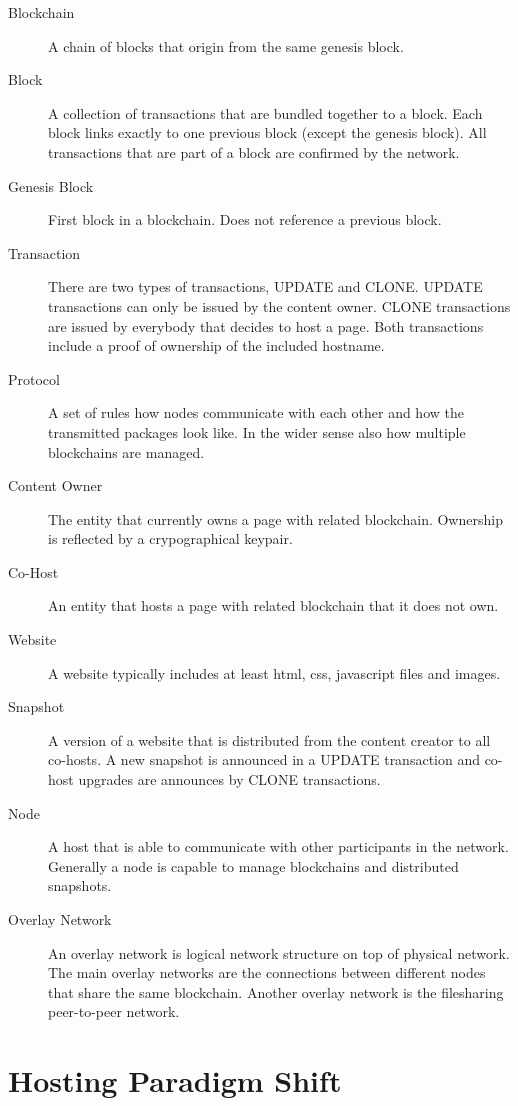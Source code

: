 \begin{description}
\item[Blockchain] A chain of blocks that origin from the same genesis block.
\item[Block] A collection of transactions that are bundled together to a
block. Each block links exactly to one previous block (except the genesis
block). All transactions that are part of a block are confirmed by the network.
\item[Genesis Block] First block in a blockchain. Does not reference a
previous block.
\item[Transaction] There are two types of transactions, UPDATE and CLONE.
UPDATE transactions can only be issued by the content owner. CLONE
transactions are issued by everybody that decides to host a page. Both
transactions include a proof of ownership of the included hostname.
\item[Protocol] A set of rules how nodes communicate with each other and how
the transmitted packages look like. In the wider sense also how multiple
blockchains are managed.
\item[Content Owner] The entity that currently owns a page with related
blockchain. Ownership is reflected by a crypographical keypair.
\item[Co-Host] An entity that hosts a page with related blockchain that it
does not own.
\item[Website] A website typically includes at least html, css, javascript
files and images.
\item[Snapshot] A version of a website that is distributed from the content
creator to all co-hosts. A new snapshot is announced in a UPDATE transaction
and co-host upgrades are announces by CLONE transactions.
\item[Node] A host that is able to communicate with other participants in the
network. Generally a node is capable to manage blockchains and distributed
snapshots.
\item[Overlay Network] An overlay network is logical network structure on top
of physical network. The main overlay networks are the connections between
different nodes that share the same blockchain. Another overlay network is the
filesharing peer-to-peer network.
\end{description}

\section{Hosting Paradigm Shift}

